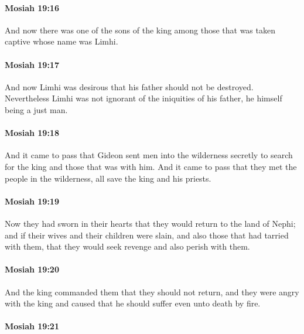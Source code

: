 		\paragraph{Mosiah 19:16} %
			\label{MOSIAH-19-16}

			And now there was one of the sons of the king
			among those that was taken captive
			whose name was Limhi.

		\paragraph{Mosiah 19:17} %
			\label{MOSIAH-19-17}

			And now Limhi was desirous that his father should not be destroyed.
			Nevertheless Limhi was not ignorant of the iniquities of his father,
			he himself being a just man.

		\paragraph{Mosiah 19:18} %
			\label{MOSIAH-19-18}

			And it came to pass that Gideon sent men into the wilderness secretly
			to search for the king and those that was with him.
			And it came to pass that they met the people in the wilderness,
			all save the king and his priests.

		\paragraph{Mosiah 19:19} %
			\label{MOSIAH-19-19}

			Now they had sworn in their hearts
			that they would return to the land of Nephi;
			and if their wives and their children were slain,
			and also those that had tarried with them,
			that they would seek revenge and also perish with them.

		\paragraph{Mosiah 19:20} %
			\label{MOSIAH-19-20}

			And the king commanded them that they should not return,
			and they were angry with the king
			and caused that he should suffer even unto death by fire.

		\paragraph{Mosiah 19:21} %
			\label{MOSIAH-19-21}

